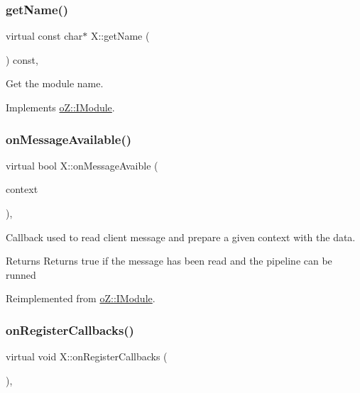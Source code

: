 \subsubsection{\texorpdfstring{getName()}{getName()}}
{\footnotesize\ttfamily virtual const char$\ast$ X\+::get\+Name (\begin{DoxyParamCaption}\item[{void}]{ }\end{DoxyParamCaption}) const\hspace{0.3cm}{\ttfamily [inline]}, {\ttfamily [virtual]}}



Get the module name. 



Implements \mbox{\hyperlink{classo_z_1_1_i_module_af41d45158fd28e1bd86a34e25f5282d6}{o\+Z\+::\+I\+Module}}.

\mbox{\label{class_x_a5ca389f4b8f8ffb518cc37336f212118}} 
\subsubsection{\texorpdfstring{onMessageAvailable()}{onMessageAvailable()}}
{\footnotesize\ttfamily virtual bool X\+::on\+Message\+Avaible (\begin{DoxyParamCaption}\item[{\mbox{\hyperlink{classo_z_1_1_context}{o\+Z\+::\+Context}} \&}]{context }\end{DoxyParamCaption})\hspace{0.3cm}{\ttfamily [inline]}, {\ttfamily [virtual]}}



Callback used to read client message and prepare a given context with the data. 

\begin{DoxyReturn}{Returns}
Returns true if the message has been read and the pipeline can be runned 
\end{DoxyReturn}


Reimplemented from \mbox{\hyperlink{classo_z_1_1_i_module_ae7f25d557f48e4117979818ec89b9e12}{o\+Z\+::\+I\+Module}}.

\mbox{\label{class_x_a15a956080c7158b8979f2a674ca28443}} 
\subsubsection{\texorpdfstring{onRegisterCallbacks()}{onRegisterCallbacks()}}
{\footnotesize\ttfamily virtual void X\+::on\+Register\+Callbacks (\begin{DoxyParamCaption}\item[{\mbox{\hyperlink{classo_z_1_1_pipeline}{Pipeline}} \&}]{ }\end{DoxyParamCaption})\hspace{0.3cm}{\ttfamily [inline]}, {\ttfamily [virtual]}}



